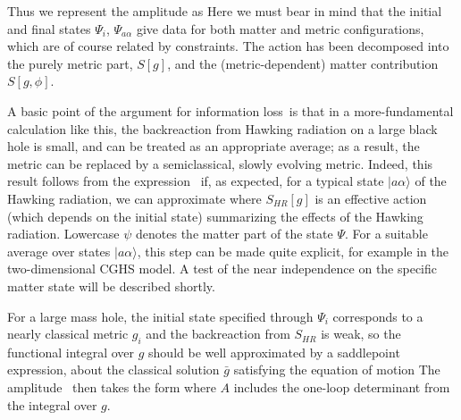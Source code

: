 Thus we represent the amplitude as
%
\eqn{}
%
Here we must bear in mind that the  initial and final states $\Psi_i$, $\Psi_{a\alpha}$ give data for both matter and metric configurations, 
which are of course related by constraints.  The action has been decomposed into the purely metric part, $S[g]$, and the (metric-dependent) matter contribution $S[g,\phi]$.

A basic point of the argument for information loss\Hawkunc\ is that in a more-fundamental calculation like this, the backreaction from Hawking radiation on a large black hole is small, and can be treated as an appropriate average; as a result, the metric can be replaced by a semiclassical, slowly evolving metric.  Indeed, this result follows from the expression \fctlint\ if, as expected, for a typical state $|a\alpha\rangle$ of the Hawking radiation, we can approximate
%
\eqn{}
%
where $S_{HR}[g]$ is an effective action (which depends on the initial state) summarizing the effects of the Hawking radiation.  Lowercase $\psi$ denotes the matter part of the state $\Psi$.  For a suitable average over states $|a\alpha\rangle$, this step can be made quite explicit, for example in the two-dimensional CGHS model.  A test of the near independence on the specific matter state will be described shortly.

For a large mass hole, the initial state specified through $\Psi_i$ corresponds to a nearly classical metric $g_i$
 and the backreaction from $S_{HR}$ is weak, so the functional integral over $g$ should be well approximated by a saddlepoint expression, about the classical solution $\bar g$ satisfying the equation of motion
%
\eqn{}
%
The amplitude \fctlint\ then takes the form
%
\eqn{}
%
where $A$ includes the one-loop determinant from the integral over $g$.





